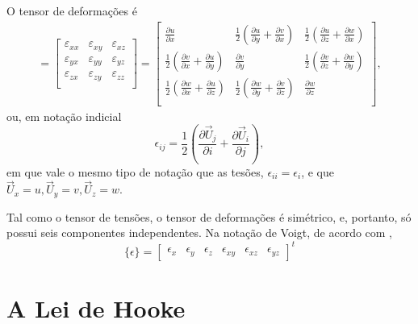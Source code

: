 O tensor de deformações é
\begin{gather}
    [\mathbf{\epsilon}] = 
    \begin{bmatrix}
        \varepsilon_{xx} & \varepsilon_{xy} & \varepsilon_{xz} \\
        \varepsilon_{yx} & \varepsilon_{yy} & \varepsilon_{yz} \\
        \varepsilon_{zx} & \varepsilon_{zy} & \varepsilon_{zz} \\
    \end{bmatrix}
        =
    \begin{bmatrix}
        \frac{\partial u}{\partial x} & \frac{1}{2} \left(\frac{\partial u}{\partial y}+\frac{\partial v}{\partial x}\right) & \frac{1}{2} \left(\frac{\partial u}{\partial z}+\frac{\partial w}{\partial x}\right) \\
        \frac{1}{2} \left(\frac{\partial v}{\partial x}+\frac{\partial u}{\partial y}\right) & \frac{\partial v}{\partial y} & \frac{1}{2} \left(\frac{\partial v}{\partial z}+\frac{\partial w}{\partial y}\right) \\
        \frac{1}{2} \left(\frac{\partial w}{\partial x}+\frac{\partial u}{\partial z}\right) & \frac{1}{2} \left(\frac{\partial w}{\partial y}+\frac{\partial v}{\partial z}\right) & \frac{\partial w}{\partial z} \\
    \end{bmatrix},
\end{gather}
ou, em notação indicial
\begin{equation}
    \epsilon_{ij} = \frac{1}{2} \left(\frac{\partial \vec{U}_j}{\partial i} + \frac{\partial \vec{U}_i}{\partial j}\right),
\end{equation}
em que vale o mesmo tipo de notação que as tesões, $\epsilon_{ii} = \epsilon_i$, e que $\vec{U}_x = u, \vec{U}_y = v, \vec{U}_z = w$.

Tal como o tensor de tensões, o tensor de deformações é simétrico, e, portanto, só possui seis componentes independentes. Na notação de Voigt, de acordo com ,
\begin{equation}
    \{\epsilon\} = \begin{bmatrix}
        \epsilon_x & \epsilon_y & \epsilon_z & \epsilon_{xy} & \epsilon_{xz} & \epsilon_{yz}
    \end{bmatrix}^t
\end{equation}

\section{A Lei de Hooke}

